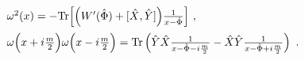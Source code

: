 \begin{equation}
\label{eq:lxy}
\begin{array}{ccl}\vspace{.2cm}
&& \omega^2(x)= - {\rm Tr}\Big[\Big(W'(\hat \Phi)+[\hat X,\hat Y]\Big)\frac1{x-\hat\Phi}\Big] \ ,
\\ 
&& \omega\Big(x+i\frac m2\Big)\omega\Big(x-i\frac m2\Big)
={\rm Tr}\left(\hat Y\hat X\frac1{x-\hat\Phi-i\frac m2}-\hat X\hat Y\frac1{x-\hat\Phi+i\frac m2}\right)\ . 
\end{array}
\end{equation}

